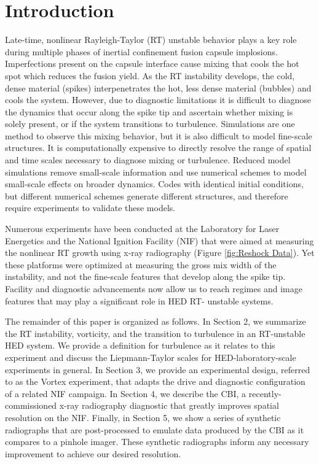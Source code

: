 \documentclass[%
 aip,
 amsmath,amssymb,
 reprint,
 floatfix
]{revtex4-1}
\begin{document}
\maketitle

\section{Introduction}

Late-time, nonlinear Rayleigh-Taylor (RT) unstable behavior plays a key role during multiple phases of inertial confinement fusion capsule implosions.  Imperfections present on the capsule interface cause mixing that cools the hot spot which reduces the fusion yield. \cite{Remington:2006,Robey:2003, RPD, Nagel:2017, Smalyuk:2017, Hurricane_2016, Clark_2019}  As the RT instability develops, the cold, dense material (spikes) interpenetrates the hot, less dense material (bubbles) and cools the system. However, due to diagnostic limitations it is difficult to diagnose the dynamics that occur along the spike tip and ascertain whether mixing is solely present, or if the system transitions to turbulence. Simulations are one method to observe this mixing behavior, but it is also difficult to model fine-scale structures. It is computationally expensive to  directly resolve the range of spatial and time scales necessary to diagnose mixing or turbulence. Reduced model simulations remove small-scale information and use numerical schemes to model small-scale effects on broader dynamics. Codes with identical initial conditions, but different numerical schemes generate different structures, \cite{darlington2001study, miles2004bubble} and therefore require experiments to validate these models. 




 Numerous experiments have been conducted at the Laboratory for Laser Energetics and the National Ignition Facility (NIF) that were aimed at measuring the nonlinear RT growth using x-ray radiography (Figure \ref{fig:Reshock Data}). \cite{Nagel:2017, Robey:2003, Zhou:2017}  Yet these platforms were optimized at measuring the gross mix width of the instability, and not the fine-scale features that develop along the spike tip.  Facility and diagnostic advancements now allow us to reach regimes and image features that may play a significant role in HED RT- unstable systems. 


The remainder of this paper is organized as follows. In Section 2, we summarize the RT instability, vorticity, and the transition to turbulence in an RT-unstable HED system.  We provide a definition for turbulence as it relates to this experiment and discuss the Liepmann-Taylor scales for HED-laboratory-scale experiments in general. In Section 3, we provide an experimental design, referred to as the Vortex experiment,  that adapts the drive and diagnostic configuration of a related NIF campaign. In Section 4, we describe the CBI, a recently-commissioned x-ray radiography diagnostic that greatly improves spatial resolution on the NIF. Finally, in Section 5, we show a series of synthetic radiographs that are post-processed to emulate data produced by the CBI as it compares to a pinhole imager.  These synthetic radiographs inform any necessary improvement to achieve our desired resolution.  
\end{document}
